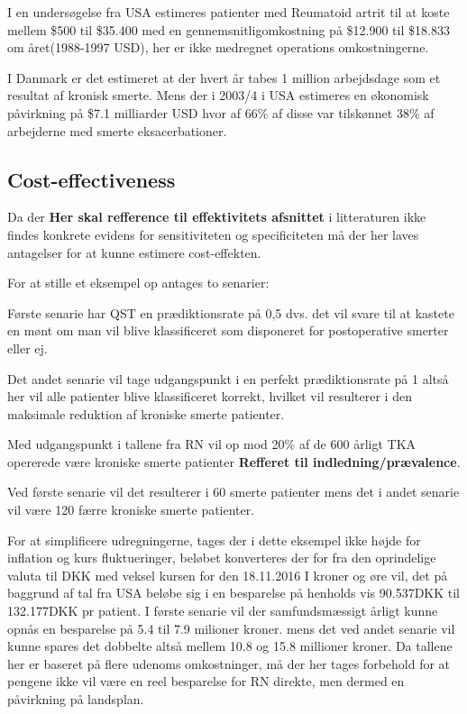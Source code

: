 I en undersøgelse fra USA estimeres patienter med Reumatoid artrit til at koste mellem \$500 til \$35.400 med en gennemsnitligomkostning på \$12.900 til \$18.833  om året(1988-1997 USD), her er ikke medregnet operations omkostningerne.\citep{Turk2002}

I Danmark er det estimeret at der hvert år tabes 1 million arbejdsdage som et resultat af kronisk smerte.\citep{Eriksen2006} Mens der i 2003/4 i USA estimeres en økonomisk påvirkning på \$7.1 milliarder USD hvor af 66\% af disse var tilskønnet 38\% af arbejderne med smerte eksacerbationer. \citep{Phillips2009}

\subsection{Cost-effectiveness}

Da der \textbf{Her skal refference til effektivitets afsnittet} i litteraturen ikke findes konkrete evidens for sensitiviteten og specificiteten må der her laves antagelser for at kunne estimere cost-effekten. 

For at stille et eksempel op antages to senarier:

Første senarie har QST en prædiktionsrate på 0,5 dvs. det vil svare til at kastete en mønt om man vil blive klassificeret som disponeret for postoperative smerter eller ej.

Det andet senarie vil tage udgangspunkt i en perfekt prædiktionsrate på 1 altså her vil alle patienter blive klassificeret korrekt, hvilket vil resulterer i den maksimale  reduktion af kroniske smerte patienter.

Med udgangspunkt i tallene fra RN vil op mod 20\% af de 600 årligt TKA opererede være kroniske smerte patienter \textbf{Refferet til indledning/prævalence}.

Ved første senarie vil det resulterer i 60 smerte patienter mens det i andet senarie vil være 120 færre kroniske smerte patienter. 

For at simplificere udregningerne, tages der i dette eksempel ikke højde for inflation og kurs fluktueringer, beløbet konverteres der for fra den oprindelige valuta til DKK med veksel kursen for den 18.11.2016
I kroner og øre vil, det på baggrund af tal fra USA beløbe sig i en besparelse på henholds vis 90.537DKK til 132.177DKK pr patient. I første senarie vil der samfundsmæssigt årligt kunne opnås en besparelse på 5.4 til 7.9 milioner kroner. mens det ved andet senarie vil kunne spares det dobbelte altså mellem 10.8 og 15.8 millioner kroner. Da tallene her er baseret på flere udenoms omkostninger, må der her tages forbehold for at pengene ikke vil være en reel besparelse for RN direkte, men dermed en påvirkning på landsplan.


